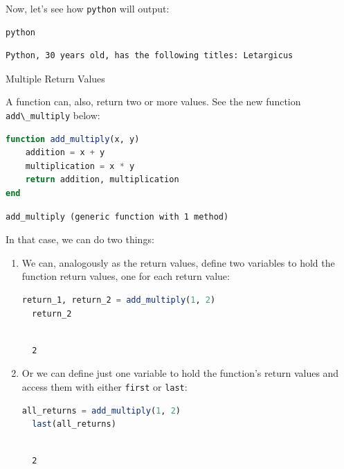 \documentclass[
  notoc %
]{tufte-book}
\makeatletter
\newcommand{\passthrough}[1]{#1}
\renewcommand\subsubsection{%
\@startsection{subsubsection}{3}{\z@ }{-3.25ex\@plus -1ex \@minus -.2ex}{1.5ex \@plus .2ex}{\normalfont \normalsize \bfseries }
}
\makeatother
\begin{document}
Now, let's see how \passthrough{\lstinline!python!} will output:

\begin{lstlisting}[language=Julia]
python
\end{lstlisting}

\begin{lstlisting}[language=Output]
Python, 30 years old, has the following titles: Letargicus
\end{lstlisting}

\hypertarget{sec:function_multiple}{%
\subsubsection{Multiple Return Values}\label{sec:function_multiple}}

A function can, also, return two or more values. See the new function
\passthrough{\lstinline!add\_multiply!} below:

\begin{lstlisting}[language=Julia]
function add_multiply(x, y)
    addition = x + y
    multiplication = x * y
    return addition, multiplication
end
\end{lstlisting}

\begin{lstlisting}[language=Output]
add_multiply (generic function with 1 method)
\end{lstlisting}

In that case, we can do two things:

\begin{enumerate}
\def\labelenumi{\arabic{enumi}.}
\item
  We can, analogously as the return values, define two variables to hold
  the function return values, one for each return value:

  \begin{lstlisting}[language=Julia]
  return_1, return_2 = add_multiply(1, 2)
  return_2
  \end{lstlisting}

  \begin{lstlisting}[language=Output]

  2

  \end{lstlisting}
\item
  Or we can define just one variable to hold the function's return
  values and access them with either \passthrough{\lstinline!first!} or
  \passthrough{\lstinline!last!}:

  \begin{lstlisting}[language=Julia]
  all_returns = add_multiply(1, 2)
  last(all_returns)
  \end{lstlisting}

  \begin{lstlisting}[language=Output]

  2

  \end{lstlisting}
\end{enumerate}
\end{document}
